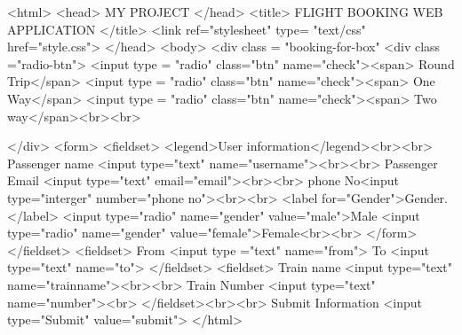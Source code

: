 <html>
<head> MY PROJECT </head>
<title> FLIGHT BOOKING WEB APPLICATION </title>
<link ref="stylesheet" type= "text/css" href="style.css">
</head>
<body>
<div class = "booking-for-box"
<div class ="radio-btn">
<input type = "radio" class="btn" name="check"><span> Round Trip</span>
<input type = "radio" class="btn" name="check"><span> One Way</span>
<input type = "radio" class="btn" name="check"><span> Two way</span><br><br>

</div>
<form>
<fieldset>
<legend>User information</legend><br><br>
Passenger name <input type="text" name="username"><br><br>
Passenger Email <input type="text" email="email"><br><br>
phone No<input type="interger" number="phone no"><br><br>
<label for="Gender">Gender.</label>
 <input type="radio" name="gender" value="male">Male
 <input type="radio" name="gender" value="female">Female<br><br>
</form>
</fieldset>
<fieldset>
From <input type ="text" name="from">
To <input type="text" name="to">
</fieldset>
<fieldset>
Train name  <input type="text" name="trainname"><br><br>
Train Number  <input type="text" name="number"><br>
</fieldset><br><br>
 Submit Information <input type="Submit" value="submit">
</html>
